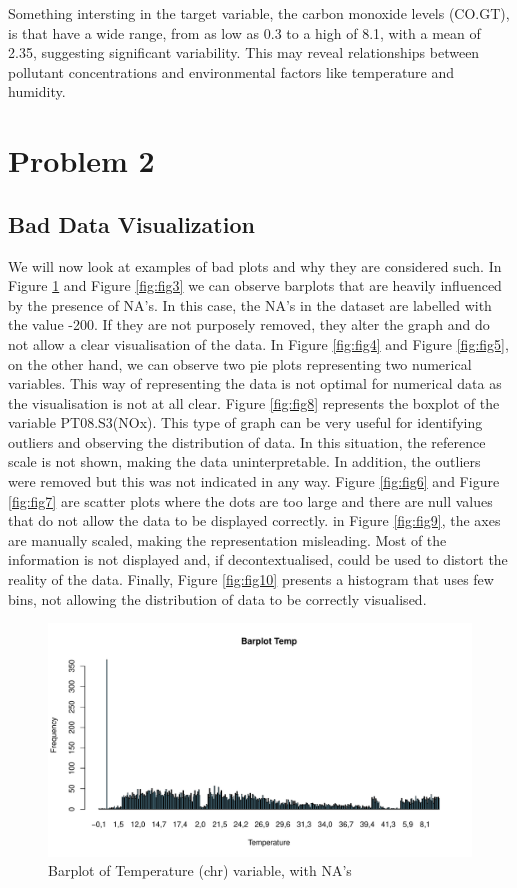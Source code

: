 \documentclass{article}
\begin{document}
Something intersting in the target variable, the carbon monoxide levels (CO.GT), is that have a wide range, from as low as 0.3 to a high of 8.1, with a mean of 2.35, suggesting significant variability. This may reveal relationships between pollutant concentrations and environmental factors like temperature and humidity.
\newpage
\section{Problem 2}
\subsection{Bad Data Visualization}
We will now look at examples of bad plots and why they are considered such.
In Figure \ref{fig:fig2} and Figure \ref{fig:fig3} we can observe barplots that are heavily influenced by the presence of NA's. In this case, the NA's in the dataset are labelled with the value -200. If they are not purposely removed, they alter the graph and do not allow a clear visualisation of the data.
In Figure \ref{fig:fig4} and Figure \ref{fig:fig5}, on the other hand, we can observe two pie plots representing two numerical variables. This way of representing the data is not optimal for numerical data as the visualisation is not at all clear.
Figure \ref{fig:fig8} represents the boxplot of the variable PT08.S3(NOx). This type of graph can be very useful for identifying outliers and observing the distribution of data. In this situation, the reference scale is not shown, making the data uninterpretable. In addition, the outliers were removed but this was not indicated in any way.
Figure \ref{fig:fig6} and Figure \ref{fig:fig7} are scatter plots where the dots are too large and there are null values that do not allow the data to be displayed correctly.
in Figure \ref{fig:fig9}, the axes are manually scaled, making the representation misleading. Most of the information is not displayed and, if decontextualised, could be used to distort the reality of the data.
Finally, Figure \ref{fig:fig10} presents a histogram that uses few bins, not allowing the distribution of data to be correctly visualised.
\begin{figure}[H]
   \centering
   \includegraphics[width=\linewidth]{images/barplottemp.pdf}
   \caption{Barplot of Temperature (chr) variable, with NA's}
   \label{fig:fig2}
\end{figure}
\end{document}

